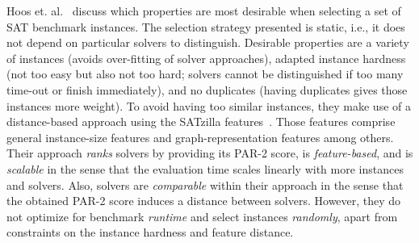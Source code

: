 \documentclass[runningheads]{llncs}
\begin{document}
Hoos et. al.~\cite{HoosKSS13} discuss which properties are most desirable when selecting a set of SAT benchmark instances.
The selection strategy presented is static, i.e., it does not depend on particular solvers to distinguish.
Desirable properties are a variety of instances (avoids over-fitting of solver approaches), adapted instance hardness (not too easy but also not too hard; solvers cannot be distinguished if too many time-out or finish immediately), and no duplicates (having duplicates gives those instances more weight).
To avoid having too similar instances, they make use of a distance-based approach using the SATzilla features~\cite{XuHHL08,features}.
Those features comprise general instance-size features and graph-representation features among others.
Their approach \emph{ranks} solvers by providing its PAR-2 score, is \emph{feature-based}, and is \emph{scalable} in the sense that the evaluation time scales linearly with more instances and solvers.
Also, solvers are \emph{comparable} within their approach in the sense that the obtained PAR-2 score induces a distance between solvers.
However, they do not optimize for benchmark \emph{runtime} and select instances \emph{randomly}, apart from constraints on the instance hardness and feature distance.



\end{document}
